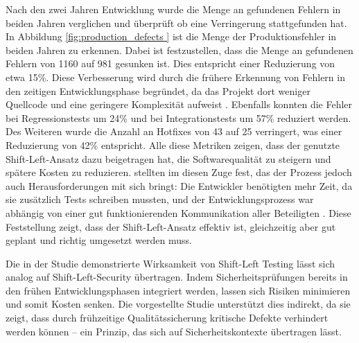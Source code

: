 Nach den zwei Jahren Entwicklung wurde die Menge an gefundenen Fehlern in beiden Jahren verglichen und überprüft ob eine Verringerung stattgefunden hat. In Abbildung \ref{fig:production_defects } ist die Menge der Produktionsfehler in beiden Jahren zu erkennen. Dabei ist festzustellen, dass die Menge an gefundenen Fehlern von 1160 auf 981 gesunken ist. Dies entspricht einer Reduzierung von etwa 15\%. Diese Verbesserung wird durch die frühere Erkennung von Fehlern in den zeitigen Entwicklungsphase begründet, da das Projekt dort weniger Quellcode und eine geringere Komplexität aufweist \cite{andriadi_impact_2023}. Ebenfalls konnten die Fehler bei Regressionstests um 24\% und bei Integrationstests um 57\% reduziert werden. Des Weiteren wurde die Anzahl an Hotfixes von 43 auf 25 verringert, was einer Reduzierung von 42\% entspricht. Alle diese Metriken zeigen, dass der genutzte Shift-Left-Ansatz dazu beigetragen hat, die Softwarequalität zu steigern und spätere Kosten zu reduzieren. \citet{andriadi_impact_2023} stellten im diesen Zuge fest, das der Prozess jedoch auch Herausforderungen mit sich bringt: Die Entwickler benötigten mehr Zeit, da sie zusätzlich Tests schreiben mussten, und der Entwicklungsprozess war abhängig von einer gut funktionierenden Kommunikation aller Beteiligten \cite{andriadi_impact_2023}. Diese Feststellung zeigt, dass der Shift-Left-Ansatz effektiv ist, gleichzeitig aber gut geplant und richtig umgesetzt werden muss.

Die in der Studie demonstrierte Wirksamkeit von Shift-Left Testing lässt sich analog auf Shift-Left-Security übertragen. Indem Sicherheitsprüfungen bereits in den frühen Entwicklungsphasen integriert werden, lassen sich Risiken minimieren und somit Kosten senken. Die vorgestellte Studie unterstützt dies indirekt, da sie zeigt, dass durch frühzeitige Qualitätssicherung kritische Defekte verhindert werden können – ein Prinzip, das sich auf Sicherheitskontexte übertragen lässt.